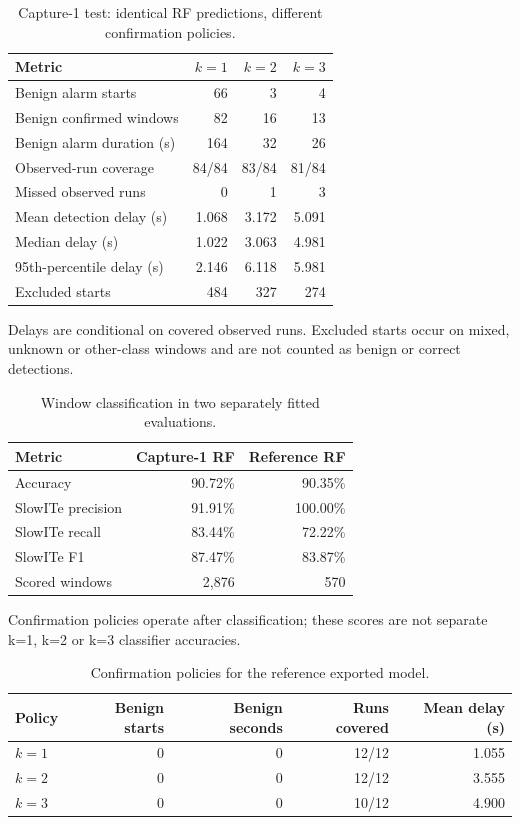 \begin{table}[t]
\centering
\caption{Capture-1 test: identical RF predictions, different confirmation policies.}
\label{tab:main}
\begin{tabularx}{\columnwidth}{Xrrr}
\toprule
Metric & $k=1$ & $k=2$ & $k=3$ \\
\midrule
Benign alarm starts & 66 & 3 & 4 \\
Benign confirmed windows & 82 & 16 & 13 \\
Benign alarm duration (s) & 164 & 32 & 26 \\
Observed-run coverage & 84/84 & 83/84 & 81/84 \\
Missed observed runs & 0 & 1 & 3 \\
Mean detection delay (s) & 1.068 & 3.172 & 5.091 \\
Median delay (s) & 1.022 & 3.063 & 4.981 \\
95th-percentile delay (s) & 2.146 & 6.118 & 5.981 \\
Excluded starts & 484 & 327 & 274 \\
\bottomrule
\end{tabularx}
\smallskip
\parbox{\columnwidth}{\footnotesize Delays are conditional on covered observed runs. Excluded starts occur on mixed, unknown or other-class windows and are not counted as benign or correct detections.}
\end{table}

\begin{table}[t]
\centering
\caption{Window classification in two separately fitted evaluations.}
\label{tab:classification}
\begin{tabularx}{\columnwidth}{Xrr}
\toprule
Metric & Capture-1 RF & Reference RF \\
\midrule
Accuracy & 90.72\% & 90.35\% \\
SlowITe precision & 91.91\% & 100.00\% \\
SlowITe recall & 83.44\% & 72.22\% \\
SlowITe F1 & 87.47\% & 83.87\% \\
Scored windows & 2,876 & 570 \\
\bottomrule
\end{tabularx}
\smallskip
\parbox{\columnwidth}{\footnotesize Confirmation policies operate after classification; these scores are not separate k=1, k=2 or k=3 classifier accuracies.}
\end{table}

\begin{table}[t]
\centering
\caption{Confirmation policies for the reference exported model.}
\label{tab:reference_policy}
\begin{tabularx}{\textwidth}{>{\raggedright\arraybackslash}Xrrrr}
\toprule
Policy & Benign starts & Benign seconds & Runs covered & Mean delay (s) \\
\midrule
$k=1$ & 0 & 0 & 12/12 & 1.055 \\
$k=2$ & 0 & 0 & 12/12 & 3.555 \\
$k=3$ & 0 & 0 & 10/12 & 4.900 \\
\bottomrule
\end{tabularx}
\end{table}


